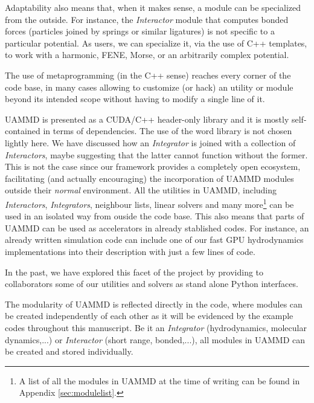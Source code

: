 \documentclass[ twoside,openright,titlepage,numbers=noenddot,%
headinclude,footinclude,cleardoublepage=empty,abstract=on,
BCOR=5mm,paper=a4,fontsize=11pt, dvipsnames
]{scrreprt}
\newcommand{\uammd}{\gls{UAMMD}\xspace}
\newcommand{\gpu}{\gls{GPU}\xspace}
\begin{document}
Adaptability also means that, when it makes sense, a module can be specialized from the outside. For instance, the \emph{Interactor} module that computes bonded forces (particles joined by springs or similar ligatures) is not specific to a particular potential. As users, we can specialize it, via the use of C++ templates, to work with a harmonic\cite{harmonic}, FENE\cite{fene}, Morse\cite{morse}, or an arbitrarily complex potential.

The use of metaprogramming (in the C++ sense) reaches every corner of the code base, in many cases allowing to customize (or hack) an utility or module beyond its intended scope without having to modify a single line of it.

\uammd is presented as a CUDA/C++ header-only library and it is mostly self-contained in terms of dependencies. The use of the word library is not chosen lightly here. We have discussed how an \emph{Integrator} is joined with a collection of \emph{Interactors}, maybe suggesting that the latter cannot function without the former. This is not the case since our framework provides a completely open ecosystem, facilitating (and actually encouraging) the incorporation of \uammd modules outside their \emph{normal} environment.
All the utilities in \uammd, including \emph{Interactors}, \emph{Integrators}, neighbour lists, linear solvers and many more\footnote{A list of all the modules in \uammd at the time of writing can be found in Appendix \ref{sec:modulelist}.} can be used in an isolated way from ouside the code base. This also means that parts of \uammd can be used as accelerators in already stablished codes. For instance, an already written simulation code can include one of our fast \gpu hydrodynamics implementations into their description with just a few lines of code.

In the past, we have explored this facet of the project by providing to collaborators some of our utilities and solvers as stand alone Python interfaces.

The modularity of \uammd is reflected directly in the code, where modules can be created independently of each other as it will be evidenced by the example codes throughout this manuscript.
Be it an \emph{Integrator} (hydrodynamics, molecular dynamics,...) or \emph{Interactor} (short range, bonded,...), all modules in \uammd can be created and stored individually.
\end{document}
